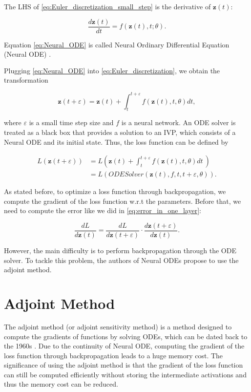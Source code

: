 \documentclass[
	parskip, 			   %
	twoside, 			   %
	DIV=14, 			   %
	BCOR=15.0mm, 		   %
	headsepline, 		   %
	open=right, 		   %
	captions=tableheading, %
	bibliography=totoc,    %
	numbers=noenddot       %
]{scrreprt}
\begin{document}
The LHS of \ref{eq:Euler_discretization_small_step} is the derivative of $\mathbf{z}(t)$:

\begin{equation}
    \label{eq:Neural_ODE}
    \frac{d\mathbf{z}(t)}{dt} = f(\mathbf{z}(t), t; \theta).
\end{equation}

Equation \ref{eq:Neural_ODE} is called Neural Ordinary Differential Equation (Neural ODE) \cite{chen2018neural}.

Plugging \ref{eq:Neural_ODE} into \ref{eq:Euler_discretization}, we obtain the transformation 

\begin{equation}
    \label{eq:Euler_transformation_NeuralODE}
    \mathbf{z}(t+\varepsilon ) = \mathbf{z}(t) + \int_{t}^{t+\varepsilon } f(\mathbf{z}(t), t, \theta)dt,
\end{equation}

where $\varepsilon $ is a small time step size and $f$ is a neural network. An ODE solver is treated as a black box that provides a solution to an IVP, which consists of a Neural ODE and its initial state. Thus, the loss function can be defined by

\begin{equation}
    \label{eq:Neural_ODE_Gradient_loss}
    \begin{aligned}
    L(\mathbf{z}(t+\varepsilon )) &= L(\mathbf{z}(t) + \int_{t}^{t+\varepsilon } f(\mathbf{z}(t), t, \theta)dt \:)\\
    &= L(ODESolver(\mathbf{z}(t), f, t, t+\varepsilon , \theta)).
    \end{aligned}
\end{equation}

As stated before, to optimize a loss function through backpropagation, we compute the gradient of the loss function w.r.t the parameters. Before that, we need to compute the error like we did in \ref{eq:error_in_one_layer}:

\begin{equation}
    \label{eq:Neural_ODE_error}
    \frac{d L}{d\mathbf{z}(t)} = \frac{d L}{d\mathbf{z}(t+\varepsilon )} \cdot \frac{d\mathbf{z}(t+\varepsilon )}{d\mathbf{z}(t)}.
\end{equation}

However, the main difficulty is to perform backpropagation through the ODE solver. To tackle this problem, the authors of Neural ODEs propose to use the adjoint method.


\section{Adjoint Method}
The adjoint method (or adjoint sensitivity method) is a method designed to compute the gradients of functions by solving ODEs, which can be dated back to the 1960s \cite{boltyanskiy1962mathematical}. Due to the continuity of Neural ODE, computing the gradient of the loss function through backpropagation leads to a huge memory cost. The significance of using the adjoint method is that the gradient of the loss function can still be computed efficiently without storing the intermediate activations and thus the memory cost can be reduced.
\end{document}
